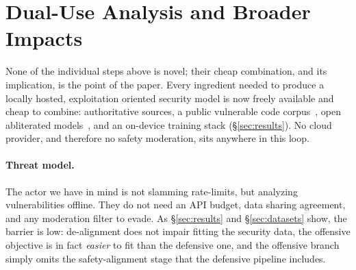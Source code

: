 \section{Dual-Use Analysis and Broader Impacts}
\label{sec:dualuse}

None of the individual steps above is novel; their cheap combination, and its
implication, is the point of the paper. Every ingredient needed to produce a
locally hosted, exploitation oriented security model is now freely available and
cheap to combine: authoritative sources, a public vulnerable code
corpus~\cite{cybernative}, open abliterated models~\cite{abliteration}, and an
on-device training stack (\S\ref{sec:results}). No cloud provider, and therefore
no safety moderation, sits anywhere in this loop.

\paragraph{Threat model.}
The actor we have in mind is not slamming rate-limits, but analyzing vulnerabilities offline.
They do not need an API budget, data sharing agreement, and any moderation filter to
evade. As \S\ref{sec:results} and \S\ref{sec:datasets} show, the barrier is low:
de-alignment does not impair fitting the security data, the offensive objective
is in fact \emph{easier} to fit than the defensive one, and the offensive branch
simply omits the safety-alignment stage that the defensive pipeline includes.


